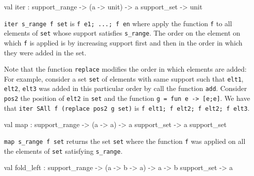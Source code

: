 \label{val:Constraint.iter}\begin{ocamldoccode}
val iter : support_range -> ({\textquotesingle}a -> unit) -> {\textquotesingle}a support_set -> unit
\end{ocamldoccode}
\begin{ocamldocdescription}
{\tt{iter s\_range f set}} is {\tt{f e1; ...; f en}} where apply the function {\tt{f}} to all elements of {\tt{set}} whose support satisfies {\tt{s\_range}}.
    The order on the element on which {\tt{f}} is applied is by increasing support first and then
    in the order in which they were added in the set.


    Note that the function {\tt{replace}} modifies the order in which elements are added:
    For example, consider a set {\tt{set}} of elements with same support such that {\tt{elt1}}, {\tt{elt2}}, {\tt{elt3}}
    was added in this particular order by call the function {\tt{add}}. Consider {\tt{pos2}} the position of {\tt{elt2}}
    in {\tt{set}} and the function {\tt{g = fun e -> [e;e]}}.
    We have that {\tt{iter SAll f (replace pos2 g set)}} is {\tt{f elt1; f elt2; f elt2; f elt3}}.


\end{ocamldocdescription}




\label{val:Constraint.map}\begin{ocamldoccode}
val map : support_range ->
  ({\textquotesingle}a -> {\textquotesingle}a) -> {\textquotesingle}a support_set -> {\textquotesingle}a support_set
\end{ocamldoccode}
\begin{ocamldocdescription}
{\tt{map s\_range f set}} returns the set {\tt{set}} where the function {\tt{f}} was applied on all
    the elements of {\tt{set}} satisfying {\tt{s\_range}}.


\end{ocamldocdescription}




\label{val:Constraint.fold-underscoreleft}\begin{ocamldoccode}
val fold_left :
  support_range ->
  ({\textquotesingle}a -> {\textquotesingle}b -> {\textquotesingle}a) -> {\textquotesingle}a -> {\textquotesingle}b support_set -> {\textquotesingle}a
\end{ocamldoccode}




